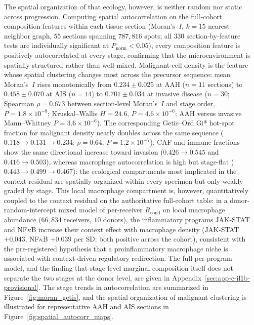 The spatial organization of that ecology, however, is neither random nor static across progression. Computing spatial autocorrelation on the full-cohort composition features within each tissue section (Moran's~$I$, $k=15$ nearest-neighbor graph, $55$ sections spanning $787{,}816$ spots; all $330$ section-by-feature tests are individually significant at $P_{\text{norm}}<0.05$), every composition feature is positively autocorrelated at every stage, confirming that the microenvironment is spatially structured rather than well-mixed. Malignant-cell density is the feature whose spatial clustering changes most across the precursor sequence: mean Moran's~$I$ rises monotonically from $0.234 \pm 0.025$ at AAH ($n=11$ sections) to $0.458 \pm 0.070$ at AIS ($n=14$) to $0.701 \pm 0.034$ at invasive disease ($n=30$; Spearman $\rho = 0.673$ between section-level Moran's~$I$ and stage order, $P = 1.8\times10^{-8}$; Kruskal--Wallis $H = 24.6$, $P = 4.6\times10^{-6}$; AAH versus invasive Mann--Whitney $P = 3.6\times10^{-6}$). The corresponding Getis--Ord Gi* hot-spot fraction for malignant density nearly doubles across the same sequence ($0.118 \rightarrow 0.131 \rightarrow 0.234$; $\rho = 0.64$, $P = 1.2\times10^{-7}$). CAF and immune fractions show the same directional increase toward invasion ($0.426 \rightarrow 0.545$ and $0.416 \rightarrow 0.503$), whereas macrophage autocorrelation is high but stage-flat ($0.443 \rightarrow 0.499 \rightarrow 0.467$): the ecological compartments most implicated in the context residual are spatially organized within every specimen but only weakly graded by stage. This local macrophage compartment is, however, quantitatively coupled to the context residual on the authoritative full-cohort table: in a donor-random-intercept mixed model of per-receiver $R_{\text{cond}}$ on local macrophage abundance ($66{,}834$ receivers, $10$ donors), the inflammatory programs JAK-STAT and NF$\kappa$B increase their context effect with macrophage density (JAK-STAT $+0.043$, NF$\kappa$B $+0.039$ per SD; both positive across the cohort), consistent with the pre-registered hypothesis that a proinflammatory macrophage niche is associated with context-driven regulatory redirection. The full per-program model, and the finding that stage-level marginal composition itself does not separate the two stages at the donor level, are given in Appendix~\ref{sec:app-c-il1b-provisional}. The stage trends in autocorrelation are summarized in Figure~\ref{fig:moran_getis}, and the spatial organization of malignant clustering is illustrated for representative AAH and AIS sections in Figure~\ref{fig:spatial_autocorr_maps}.

